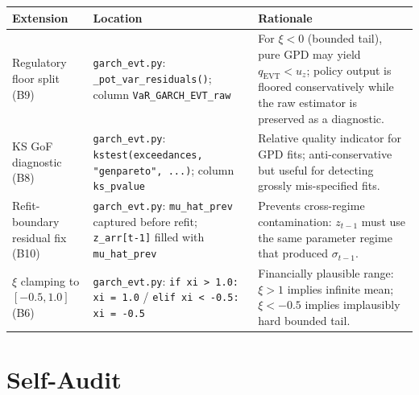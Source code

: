 \documentclass[11pt,a4paper]{article}
\newcommand{\code}[1]{\texttt{#1}}
\begin{document}
\begin{center}
\begin{tabular}{@{}p{3.5cm} p{4.0cm} p{5.5cm}@{}}
\toprule
\textbf{Extension} & \textbf{Location} & \textbf{Rationale} \\
\midrule
Regulatory floor split (B9) &
  \code{garch\_evt.py}: \code{\_pot\_var\_residuals()}; column
  \code{VaR\_GARCH\_EVT\_raw} &
  For $\xi < 0$ (bounded tail), pure GPD may yield $q_{\mathrm{EVT}} < u_z$;
  policy output is floored conservatively while the raw estimator is
  preserved as a diagnostic. \\[4pt]

KS GoF diagnostic (B8) &
  \code{garch\_evt.py}: \code{kstest(exceedances, "genpareto", ...)}; column
  \code{ks\_pvalue} &
  Relative quality indicator for GPD fits; anti-conservative but useful for
  detecting grossly mis-specified fits. \\[4pt]

Refit-boundary residual fix (B10) &
  \code{garch\_evt.py}: \code{mu\_hat\_prev} captured before refit;
  \code{z\_arr[t-1]} filled with \code{mu\_hat\_prev} &
  Prevents cross-regime contamination: $z_{t-1}$ must use the same parameter
  regime that produced $\sigma_{t-1}$. \\[4pt]

$\xi$ clamping to $[-0.5, 1.0]$ (B6) &
  \code{garch\_evt.py}: \code{if xi > 1.0: xi = 1.0} / \code{elif xi < -0.5:
  xi = -0.5} &
  Financially plausible range: $\xi > 1$ implies infinite mean; $\xi < -0.5$
  implies implausibly hard bounded tail. \\[4pt]

\bottomrule
\end{tabular}
\end{center}

\section*{Self-Audit}\label{sec:self-audit}
\end{document}
